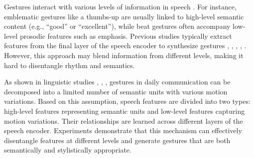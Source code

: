 Gestures interact with various levels of information in speech \citep{sebeok2011advances}. For instance, emblematic gestures like a thumbs-up are usually linked to high-level semantic content (e.g., “good” or “excellent”), while beat gestures often accompany low-level prosodic features such as emphasis. Previous studies typically extract features from the final layer of the speech encoder to synthesize gestures \citep{alexanderson2020style}, \citep{bhattacharya2021speech2affectivegestures}, \citep{kucherenko2021large}, \citep{qian2021speech}, \citep{yoon2022genea}. However, this approach may blend information from different levels, making it hard to disentangle rhythm and semantics.

As shown in linguistic studies \citep{kipp2005gesture}, \citep{neff2008gesture}, \citep{webb1997linguistic}, gestures in daily communication can be decomposed into a limited number of semantic units with various motion variations. Based on this assumption, speech features are divided into two types: high-level features representing semantic units and low-level features capturing motion variations. Their relationships are learned across different layers of the speech encoder. Experiments demonstrate that this mechanism can effectively disentangle features at different levels and generate gestures that are both semantically and stylistically appropriate.





